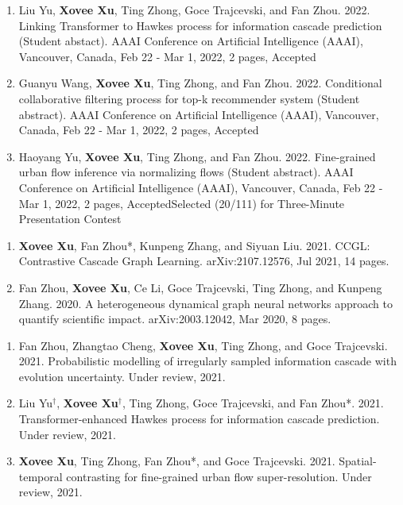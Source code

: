 
\begin{enumerate}[resume]
    \item Liu Yu, \textbf{Xovee Xu}, Ting Zhong, Goce Trajcevski, and Fan Zhou. 2022. Linking Transformer to Hawkes process for information cascade prediction (Student abstact). AAAI Conference on Artificial Intelligence (AAAI), Vancouver, Canada, Feb 22 - Mar 1, 2022, 2 pages, Accepted
    \item Guanyu Wang, \textbf{Xovee Xu}, Ting Zhong, and Fan Zhou. 2022. Conditional collaborative filtering process for top-k recommender system (Student abstract). AAAI Conference on Artificial Intelligence (AAAI), Vancouver, Canada, Feb 22 - Mar 1, 2022, 2 pages, Accepted
    \item Haoyang Yu, \textbf{Xovee Xu}, Ting Zhong, and Fan Zhou. 2022. Fine-grained urban flow inference via normalizing flows (Student abstract). AAAI Conference on Artificial Intelligence (AAAI), Vancouver, Canada, Feb 22 - Mar 1, 2022, 2 pages, Accepted\newline Selected (20/111) for Three-Minute Presentation Contest
\end{enumerate}


\begin{enumerate}[resume]
    \item \textbf{Xovee Xu}, Fan Zhou*, Kunpeng Zhang, and Siyuan Liu. 2021. CCGL: Contrastive Cascade Graph Learning. arXiv:2107.12576, Jul 2021, 14 pages. 
    \item Fan Zhou, \textbf{Xovee Xu}, Ce Li, Goce Trajcevski, Ting Zhong, and Kunpeng Zhang. 2020. A heterogeneous dynamical graph neural networks approach to quantify scientific impact. arXiv:2003.12042, Mar 2020, 8 pages. 
\end{enumerate}


\begin{enumerate}[resume]
    \item Fan Zhou, Zhangtao Cheng, \textbf{Xovee Xu}, Ting Zhong, and Goce Trajcevski. 2021. Probabilistic modelling of irregularly sampled information cascade with evolution uncertainty. Under review, 2021.
    \item Liu Yu$^\dagger$, \textbf{Xovee Xu}$^\dagger$, Ting Zhong, Goce Trajcevski, and Fan Zhou*. 2021. Transformer-enhanced Hawkes process for information cascade prediction. Under review, 2021.
    \item \textbf{Xovee Xu}, Ting Zhong, Fan Zhou*, and Goce Trajcevski. 2021. Spatial-temporal contrasting for fine-grained urban flow super-resolution. Under review, 2021.
\end{enumerate}

